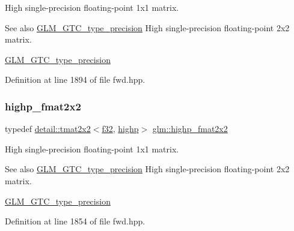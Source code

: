 High single-\/precision floating-\/point 1x1 matrix. \begin{DoxySeeAlso}{See also}
\hyperlink{group__gtc__type__precision}{G\+L\+M\+\_\+\+G\+T\+C\+\_\+type\+\_\+precision} High single-\/precision floating-\/point 2x2 matrix. 

\hyperlink{group__gtc__type__precision}{G\+L\+M\+\_\+\+G\+T\+C\+\_\+type\+\_\+precision} 
\end{DoxySeeAlso}


Definition at line 1894 of file fwd.\+hpp.

\mbox{\label{group__gtc__type__precision_gaeb76f1230ecfd4c80635d3c618405e31}} 
\subsubsection{\texorpdfstring{highp\+\_\+fmat2x2}{highp\_fmat2x2}}
{\footnotesize\ttfamily typedef \hyperlink{structglm_1_1detail_1_1tmat2x2}{detail\+::tmat2x2}$<$\hyperlink{group__gtc__type__precision_ga0ec999b57f5330d9021256e96038df04}{f32}, \hyperlink{namespaceglm_a0f04f086094c747d227af4425893f545ac6f7eab42eacbb10d59a58e95e362074}{highp}$>$ \hyperlink{group__gtc__type__precision_gaeb76f1230ecfd4c80635d3c618405e31}{glm\+::highp\+\_\+fmat2x2}}

High single-\/precision floating-\/point 1x1 matrix. \begin{DoxySeeAlso}{See also}
\hyperlink{group__gtc__type__precision}{G\+L\+M\+\_\+\+G\+T\+C\+\_\+type\+\_\+precision} High single-\/precision floating-\/point 2x2 matrix. 

\hyperlink{group__gtc__type__precision}{G\+L\+M\+\_\+\+G\+T\+C\+\_\+type\+\_\+precision} 
\end{DoxySeeAlso}


Definition at line 1854 of file fwd.\+hpp.

\mbox{\label{group__gtc__type__precision_ga53c126d1650b460bc7496a6fd5e5e764}} 
